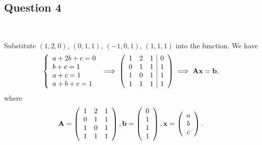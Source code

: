 \documentclass[12pt]{amsart}
\theoremstyle{plain}
\theoremstyle{definition}
\def\bf{\textbf}
\begin{document}
\newpage
\subsection*{Question 4}\ 

Substitute $(1,2,0)$, $(0,1,1)$, $(-1,0,1)$, $(1,1,1)$ into the function. We have
\begin{align*}
	\left\{
	\begin{array}{l}
		a+2b+c=0\\
		b+c=1\\
		a+c=1\\
		a+b+c=1\\
	\end{array}
	\right.
	\implies
	\left(
	\begin{array}{ccc|c}
		1 & 2 & 1 & 0\\
		0 & 1 & 1 & 1\\
		1 & 0 & 1 & 1\\
		1 & 1 & 1 & 1\\
	\end{array}
	\right)
	\implies \textbf A\textbf x=\textbf b,
\end{align*}
where
\begin{align*}
	\bf A=\left(
	\begin{array}{ccc}
		1 & 2 & 1\\
		0 & 1 & 1\\
		1 & 0 & 1\\
		1 & 1 & 1\\
	\end{array}
	\right),
	\bf b=\left(
	\begin{array}{ccc|c}
		0\\
		1\\
		1\\
		1\\
	\end{array}
	\right),
	\bf x=
	\left(
	\begin{array}{c}
		a\\
		b\\
		c\\
	\end{array}
	\right).
\end{align*}
\end{document}
